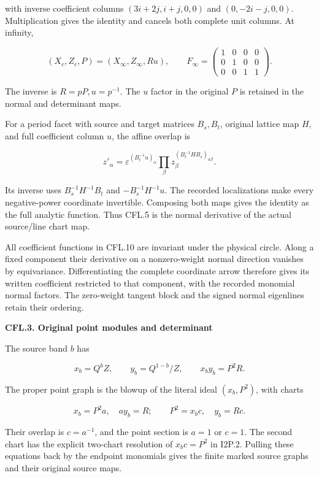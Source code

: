 with inverse coefficient columns
\((3i+2j,i+j,0,0)\) and \((0,-2i-j,0,0)\).
Multiplication gives the identity and cancels both complete
unit columns. At infinity,

\[
 (X_c,Z_c,P)=(X_\infty,Z_\infty,Ru),\qquad
 F_\infty=
 \begin{pmatrix}
 1&0&0&0\\0&1&0&0\\0&0&1&1
 \end{pmatrix}.
 \tag{CFL.9}
\]

The inverse is \(R=pP,u=p^{-1}\). The \(u\) factor in the
original \(P\) is retained in the normal and determinant maps.

For a period facet with source and target matrices \(B_s,B_t\),
original lattice map \(H\), and full coefficient column \(u\),
the affine overlap is

\[
 z'_\alpha=
 \varepsilon^{(B_t^{-1}u)_\alpha}
 \prod_\beta z_\beta^{(B_t^{-1}HB_s)_{\alpha\beta}}.
 \tag{CFL.10}
\]

Its inverse uses \(B_s^{-1}H^{-1}B_t\) and
\(-B_s^{-1}H^{-1}u\). The recorded localizations make every
negative-power coordinate invertible. Composing both maps
gives the identity as the full analytic function. Thus CFL.5
is the normal derivative of the actual source/line chart map.

All coefficient functions in CFL.10 are invariant under the
physical circle. Along a fixed component their derivative on
a nonzero-weight normal direction vanishes by equivariance.
Differentiating the complete coordinate arrow therefore gives
its written coefficient restricted to that component, with
the recorded monomial normal factors. The zero-weight tangent
block and the signed normal eigenlines retain their ordering.

\par

\medskip\noindent\textbf{CFL.3. Original point modules and determinant}

\par\nobreak

The source band \(b\) has

\[
 x_b=Q^bZ,\qquad y_b=Q^{1-b}/Z,\qquad x_by_b=P^2R.
 \tag{CFL.11}
\]

The proper point graph is the blowup of the literal ideal
\((x_b,P^2)\), with charts

\[
 x_b=P^2a,\quad ay_b=R;\qquad
 P^2=x_bc,\quad y_b=Rc.
 \tag{CFL.12}
\]

Their overlap is \(c=a^{-1}\), and the point section is
\(a=1\) or \(c=1\). The second chart has the explicit
two-chart resolution of \(x_bc=P^2\) in I2P.2. Pulling
these equations back by the endpoint monomials gives the
finite marked source graphs and their original source maps.

